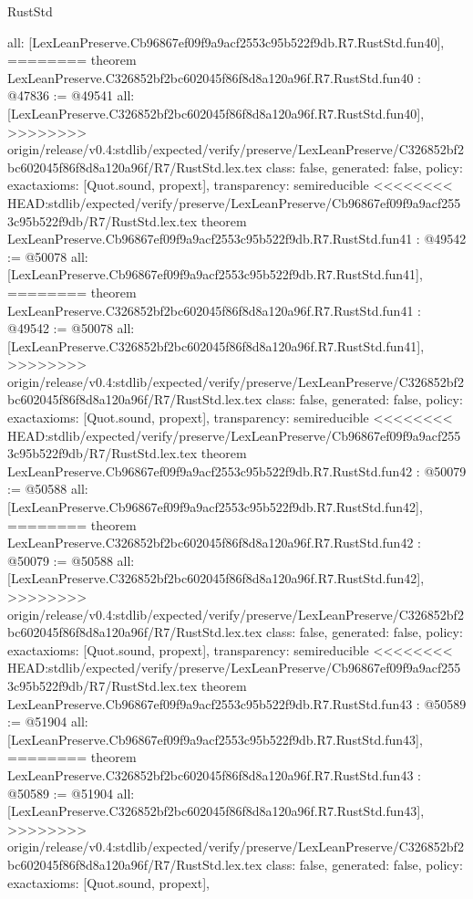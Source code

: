 \begin{lexlean}{RustStd}
\begin{coremodule}
{\begin{coremodule}
{{{{{{{{{{{{{{{{{{{{{{{{{{{{{{{{{{{{{{{{{{{  all: [LexLeanPreserve.Cb96867ef09f9a9acf2553c95b522f9db.R7.RustStd.fun40],
========
theorem LexLeanPreserve.C326852bf2bc602045f86f8d8a120a96f.R7.RustStd.fun40 : @47836 := @49541 {
  all: [LexLeanPreserve.C326852bf2bc602045f86f8d8a120a96f.R7.RustStd.fun40],
>>>>>>>> origin/release/v0.4:stdlib/expected/verify/preserve/LexLeanPreserve/C326852bf2bc602045f86f8d8a120a96f/R7/RustStd.lex.tex
  class: false,
  generated: false,
  policy: exact{axioms: [Quot.sound, propext]},
  transparency: semireducible
}
<<<<<<<< HEAD:stdlib/expected/verify/preserve/LexLeanPreserve/Cb96867ef09f9a9acf2553c95b522f9db/R7/RustStd.lex.tex
theorem LexLeanPreserve.Cb96867ef09f9a9acf2553c95b522f9db.R7.RustStd.fun41 : @49542 := @50078 {
  all: [LexLeanPreserve.Cb96867ef09f9a9acf2553c95b522f9db.R7.RustStd.fun41],
========
theorem LexLeanPreserve.C326852bf2bc602045f86f8d8a120a96f.R7.RustStd.fun41 : @49542 := @50078 {
  all: [LexLeanPreserve.C326852bf2bc602045f86f8d8a120a96f.R7.RustStd.fun41],
>>>>>>>> origin/release/v0.4:stdlib/expected/verify/preserve/LexLeanPreserve/C326852bf2bc602045f86f8d8a120a96f/R7/RustStd.lex.tex
  class: false,
  generated: false,
  policy: exact{axioms: [Quot.sound, propext]},
  transparency: semireducible
}
<<<<<<<< HEAD:stdlib/expected/verify/preserve/LexLeanPreserve/Cb96867ef09f9a9acf2553c95b522f9db/R7/RustStd.lex.tex
theorem LexLeanPreserve.Cb96867ef09f9a9acf2553c95b522f9db.R7.RustStd.fun42 : @50079 := @50588 {
  all: [LexLeanPreserve.Cb96867ef09f9a9acf2553c95b522f9db.R7.RustStd.fun42],
========
theorem LexLeanPreserve.C326852bf2bc602045f86f8d8a120a96f.R7.RustStd.fun42 : @50079 := @50588 {
  all: [LexLeanPreserve.C326852bf2bc602045f86f8d8a120a96f.R7.RustStd.fun42],
>>>>>>>> origin/release/v0.4:stdlib/expected/verify/preserve/LexLeanPreserve/C326852bf2bc602045f86f8d8a120a96f/R7/RustStd.lex.tex
  class: false,
  generated: false,
  policy: exact{axioms: [Quot.sound, propext]},
  transparency: semireducible
}
<<<<<<<< HEAD:stdlib/expected/verify/preserve/LexLeanPreserve/Cb96867ef09f9a9acf2553c95b522f9db/R7/RustStd.lex.tex
theorem LexLeanPreserve.Cb96867ef09f9a9acf2553c95b522f9db.R7.RustStd.fun43 : @50589 := @51904 {
  all: [LexLeanPreserve.Cb96867ef09f9a9acf2553c95b522f9db.R7.RustStd.fun43],
========
theorem LexLeanPreserve.C326852bf2bc602045f86f8d8a120a96f.R7.RustStd.fun43 : @50589 := @51904 {
  all: [LexLeanPreserve.C326852bf2bc602045f86f8d8a120a96f.R7.RustStd.fun43],
>>>>>>>> origin/release/v0.4:stdlib/expected/verify/preserve/LexLeanPreserve/C326852bf2bc602045f86f8d8a120a96f/R7/RustStd.lex.tex
  class: false,
  generated: false,
  policy: exact{axioms: [Quot.sound, propext]},
}}}}}}}}}}}}}}}}}}}}}}}}}}}}}}}}}}}}}}}}}}}}}}}
\end{coremodule}}
\end{coremodule}
\end{lexlean}
